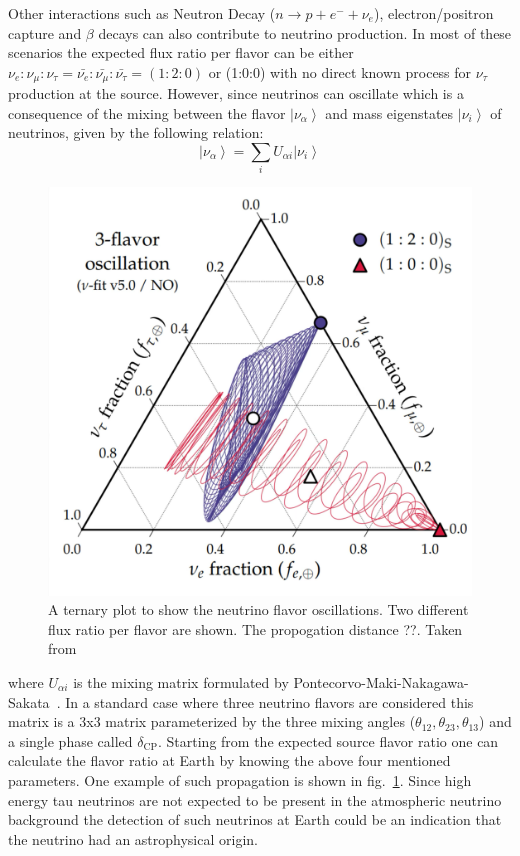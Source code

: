 Other interactions such as Neutron Decay ($n \longrightarrow p + e^- + \nu_{e} $), electron/positron capture and $\beta$ decays can also contribute to neutrino production. In most of these scenarios the expected flux ratio per flavor can be either $ \nu_{e} : \nu_{\mu} : \nu_{\tau} = \bar{\nu_{e}}: \bar{\nu_{\mu}}: \bar{\nu_{\tau}} = (1:2:0) $ or (1:0:0) with no direct known process for $\nu_{\tau}$ production at the source. However, since neutrinos can oscillate which is a consequence of the mixing between the flavor  $\left| \nu_{\alpha} \right\rangle $ and mass eigenstates $\left| \nu_{i} \right\rangle $  of neutrinos, given by the following relation:
\begin{equation}
\left| \nu_{\alpha} \right\rangle  = \sum_i U_{\alpha i} \left| \nu_{i} \right\rangle
\end{equation}
\begin{figure}[t!]
  \centering
  \includegraphics[width=12.5cm]{thesis_figures/CRnNu/Oscillation_sim_ternary.pdf}
  \caption{A ternary plot to show the neutrino flavor oscillations. Two different flux ratio per flavor are shown. The propogation distance ??. Taken from~\cite{Ahlers:ISAPP2022}}
  \label{fig:Oscillation_ternary}
\end{figure}

where $U_{\alpha i}$ is the mixing matrix formulated by Pontecorvo-Maki-Nakagawa-Sakata~\cite{Pontecorvo:1957qd,10.1143/PTP.28.870}. In a standard case where three neutrino flavors are considered this matrix is a 3x3 matrix parameterized by the three mixing angles ($\theta_{12},\theta_{23},\theta_{13}$) and a single phase called $\delta_{\text{CP}}$. Starting from the expected source flavor ratio one can calculate the flavor ratio at Earth by knowing the above four mentioned parameters. One example of such propagation is shown in fig.~\ref{fig:Oscillation_ternary}. Since high energy tau neutrinos are not expected to be present in the atmospheric neutrino background the detection of such neutrinos at Earth could be an indication that the neutrino had an astrophysical origin. 

